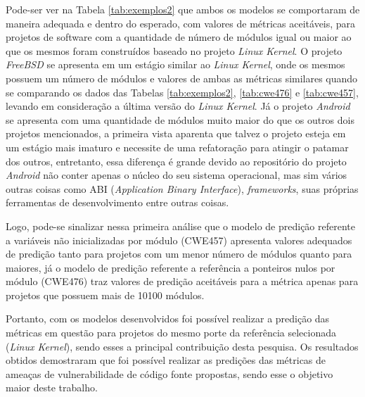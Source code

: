 Pode-ser ver na Tabela \ref{tab:exemplos2} que ambos os modelos se comportaram
de maneira adequada e dentro do esperado, com valores de métricas aceitáveis,
para projetos de software com a quantidade de número de módulos igual ou maior
ao que os mesmos foram construídos baseado no projeto \textit{Linux Kernel}. O
projeto \textit{FreeBSD} se apresenta em um estágio similar ao \textit{Linux
Kernel}, onde os mesmos possuem um número de módulos e valores de ambas as
métricas similares quando se comparando os dados das Tabelas
\ref{tab:exemplos2}, \ref{tab:cwe476} e \ref{tab:cwe457}, levando em
consideração a última versão do \textit{Linux Kernel}. Já o projeto
\textit{Android} se apresenta com uma quantidade de módulos muito maior do que
os outros dois projetos mencionados, a primeira vista aparenta que talvez o
projeto esteja em um estágio mais imaturo e necessite de uma refatoração para
atingir o patamar dos outros, entretanto, essa diferença é grande devido ao
repositório do projeto \textit{Android} não conter apenas o núcleo do seu
sistema operacional, mas sim vários outras coisas como ABI (\textit{Application
Binary Interface}), \textit{frameworks}, suas próprias ferramentas de
desenvolvimento entre outras coisas. 

Logo, pode-se sinalizar nessa primeira análise que o modelo de predição
referente a variáveis não inicializadas por módulo (CWE457) apresenta valores
adequados de predição tanto para projetos com um menor número de módulos quanto
para maiores, já o modelo de predição referente a referência a ponteiros nulos
por módulo (CWE476) traz valores de predição aceitáveis para a métrica apenas
para projetos que possuem mais de 10100 módulos. 

Portanto, com os modelos desenvolvidos foi possível realizar a predição das
métricas em questão para projetos do mesmo porte da referência selecionada
(\textit{Linux Kernel}), sendo esses a principal contribuição desta pesquisa. Os
resultados obtidos demostraram que foi possível realizar
as predições das métricas de ameaças de vulnerabilidade de código fonte
propostas, sendo esse o objetivo maior deste trabalho.

